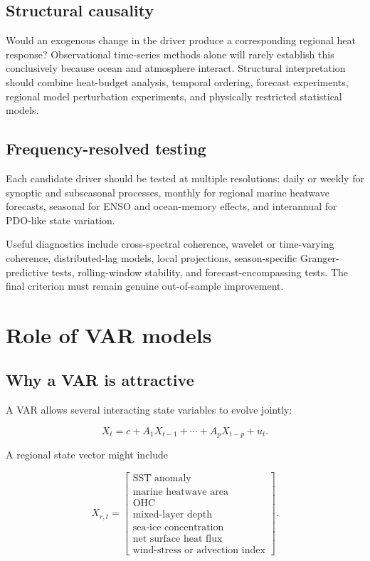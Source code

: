 \documentclass[11pt]{article}
\newcommand{\MHW}{marine heatwave}
\begin{document}
\subsection{Structural causality}

Would an exogenous change in the driver produce a corresponding regional heat response? Observational time-series methods alone will rarely establish this conclusively because ocean and atmosphere interact. Structural interpretation should combine heat-budget analysis, temporal ordering, forecast experiments, regional model perturbation experiments, and physically restricted statistical models.

\subsection{Frequency-resolved testing}

Each candidate driver should be tested at multiple resolutions: daily or weekly for synoptic and subseasonal processes, monthly for regional \MHW{} forecasts, seasonal for ENSO and ocean-memory effects, and interannual for PDO-like state variation.

Useful diagnostics include cross-spectral coherence, wavelet or time-varying coherence, distributed-lag models, local projections, season-specific Granger-predictive tests, rolling-window stability, and forecast-encompassing tests. The final criterion must remain genuine out-of-sample improvement.

\section{Role of VAR models}

\subsection{Why a VAR is attractive}

A VAR allows several interacting state variables to evolve jointly:

\begin{equation}
X_t = c + A_1X_{t-1}+\cdots+A_pX_{t-p}+u_t.
\end{equation}

A regional state vector might include

\begin{equation}
X_{r,t} =
\begin{bmatrix}
\text{SST anomaly}\\
\text{\MHW{} area}\\
\text{OHC}\\
\text{mixed-layer depth}\\
\text{sea-ice concentration}\\
\text{net surface heat flux}\\
\text{wind-stress or advection index}
\end{bmatrix}.
\end{equation}
\end{document}
